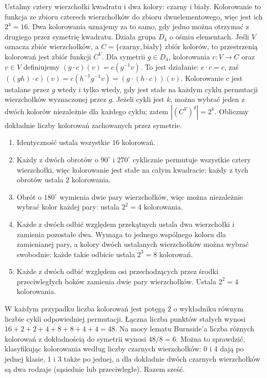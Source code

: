 \begin{przyklad}
\label{aa:prz:burnside-kwadrat}
Ustalmy cztery wierzchołki kwadratu i dwa kolory: czarny i biały.
Kolorowanie to funkcja ze zbioru czterech wierzchołków
do zbioru dwuelementowego, więc jest ich $2^4=16$.
Dwa kolorowania uznajemy za to samo, gdy jedno można otrzymać
z drugiego przez symetrię kwadratu. Działa grupa $D_4$
o ośmiu elementach. Jeśli $V$ oznacza zbiór wierzchołków,
a $C=\{\text{czarny},\text{biały}\}$ zbiór kolorów,
to przestrzenią kolorowań jest zbiór funkcji $C^V$.
Dla symetrii $g\in D_4$, kolorowania $c:V\to C$ oraz $v\in V$
definiujemy $(g\cdot c)(v)=c(g^{-1}v)$.
To jest działanie: $e\cdot c=c$, zaś
$((gh)\cdot c)(v)=c(h^{-1}g^{-1}v)
=(g\cdot(h\cdot c))(v)$.
Kolorowanie $c$ jest ustalane przez $g$ wtedy i tylko wtedy,
gdy jest stałe na każdym cyklu permutacji wierzchołków
wyznaczonej przez $g$. Jeżeli cykli jest $k$, można
wybrać jeden z dwóch kolorów niezależnie dla każdego cyklu;
zatem $| (C^V)^g |=2^k$.
Obliczmy dokładnie liczby kolorowań zachowanych przez symetrie.
\begin{enumerate}
\item Identyczność ustala wszystkie $16$ kolorowań.
\item Każdy z dwóch obrotów o $90^\circ$ i $270^\circ$
cyklicznie permutuje wszystkie cztery wierzchołki,
więc kolorowanie jest stałe na całym kwadracie:
każdy z tych obrotów ustala $2$ kolorowania.
\item Obrót o $180^\circ$ wymienia dwie pary wierzchołków,
więc można niezależnie wybrać kolor każdej pary:
ustala $2^2=4$ kolorowania.
\item Każde z dwóch odbić względem przekątnych ustala
dwa wierzchołki i zamienia pozostałe dwa.
Wymaga to jednego wspólnego koloru dla zamienianej pary,
a kolory dwóch ustalanych wierzchołków można wybrać swobodnie:
każde takie odbicie ustala $2^3=8$ kolorowań.
\item Każde z dwóch odbić względem osi przechodzących przez
środki przeciwległych boków zamienia dwie pary wierzchołków.
Ustala $2^2=4$ kolorowania.
\end{enumerate}
W każdym przypadku liczba kolorowań jest potęgą $2$
o wykładniku równym liczbie cykli odpowiedniej permutacji.
Łączna liczba punktów stałych wynosi
$16+2+2+4+8+8+4+4=48$.
Na mocy lematu Burnside'a liczba różnych kolorowań z dokładnością
do symetrii wynosi $48/8=6$.
Można to sprawdzić, klasyfikując kolorowania według liczby czarnych
wierzchołków: $0$ i $4$ dają po jednej klasie, $1$ i $3$ także
po jednej, a dla dokładnie dwóch czarnych wierzchołków
są dwa rodzaje (sąsiednie lub przeciwległe). Razem sześć.
\end{przyklad}

